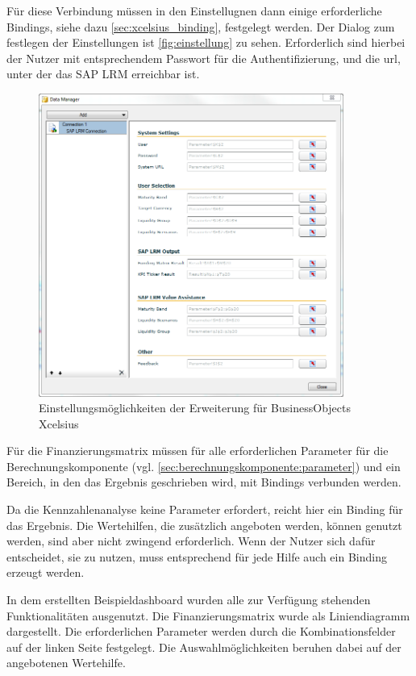 \begin{onehalfspacing}
Für diese Verbindung müssen in den Einstellugnen dann einige erforderliche Bindings, siehe dazu \vref{sec:xcelsius_binding}, festgelegt werden. Der Dialog zum festlegen der Einstellungen ist  \vref{fig:einstellung} zu sehen. Erforderlich sind hierbei der Nutzer mit entsprechendem Passwort für die Authentifizierung, und die \gls{url}, unter der das SAP LRM erreichbar ist.

\begin{figure}[!ht]
\centering
\setlength{\unitlength}{1mm}
\includegraphics[width=10cm]{images/xcelsius_einstellungen.PNG}
\caption{Einstellungsmöglichkeiten der Erweiterung für BusinessObjects Xcelsius\label{fig:einstellung}}
\end{figure} 

Für die Finanzierungsmatrix müssen für alle erforderlichen Parameter für die Berechnungskomponente (vgl. \vref{sec:berechnungskomponente:parameter}) und ein Bereich, in den das Ergebnis geschrieben wird, mit Bindings verbunden werden.

Da die Kennzahlenanalyse keine Parameter erfordert, reicht hier ein Binding für das Ergebnis. Die Wertehilfen, die zusätzlich angeboten werden, können genutzt werden, sind aber nicht zwingend erforderlich. Wenn der Nutzer sich dafür entscheidet, sie zu nutzen, muss entsprechend für jede Hilfe auch ein Binding erzeugt werden.

In dem erstellten Beispieldashboard wurden alle zur Verfügung stehenden Funktionalitäten ausgenutzt. Die Finanzierungsmatrix wurde als Liniendiagramm dargestellt. Die erforderlichen Parameter werden durch die Kombinationsfelder auf der linken Seite festgelegt. Die Auswahlmöglichkeiten beruhen dabei auf der angebotenen Wertehilfe. 


\end{onehalfspacing}
